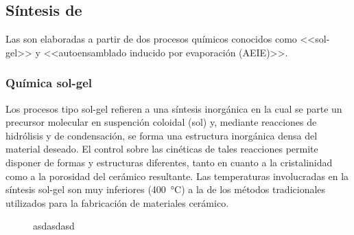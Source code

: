 	\subsection{Síntesis de \pdm}

	Las \pdm\space son elaboradas a partir de dos procesos químicos conocidos como <<sol-gel>> y <<autoensamblado inducido por evaporación (AEIE)>>.

	\subsubsection{Química sol-gel}

	Los procesos tipo sol-gel refieren a una síntesis inorgánica en la cual se parte un precursor molecular en suspención coloidal (sol) y, mediante reacciones de hidrólisis y de condensación, se  forma una estructura inorgánica densa del material deseado. El control sobre las cinéticas de tales reacciones permite disponer de formas y estructuras diferentes, tanto en cuanto a la cristalinidad como a la porosidad del cerámico resultante. Las temperaturas involucradas en la síntesis sol-gel son muy inferiores (\SI{400}{\celsius}) a la de los métodos tradicionales utilizados para la fabricación de materiales cerámico.\cite{Brinker1990} 

	
	 \begin{figure}[ht!]
 				\begin{center}
 				
 				\caption[asd]{asdasdasd}
 		   		\label{fig:sensores}
 		    	\end{center}
 		    	\end{figure}

 	

	


		




